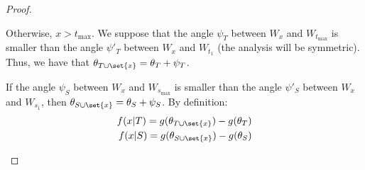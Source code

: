 \documentclass{article}
\theoremstyle{definition}
\theoremstyle{remark}
\begin{document}
\begin{proof}
\begin{enumerate}[label={(\arabic*)}]
      Otherwise, $x > t_{\max}$. We suppose that the angle $\psi_T$ between $W_x$ and $W_{t_{\max}}$ is smaller than the angle $\psi'_T$ between $W_x$ and $W_{t_1}$ (the analysis will be symmetric). Thus, we have that $\theta_{T \cup \set{x}} = \theta_T+\psi_T$.
      
      If the angle $\psi_S$ between $W_x$ and $W_{s_{\max}}$ is smaller than the angle $\psi'_S$ between $W_x$ and $W_{s_1}$, then $\theta_{S \cup \set{x}} = \theta_S+\psi_S$. By definition:
      \begin{equation}
        \begin{aligned}
          f(x|T) = g(\theta_{T \cup \set{x}})-g(\theta_T)\\
          f(x|S) = g(\theta_{S \cup \set{x}})-g(\theta_S)\\
        \end{aligned}
      \end{equation}


\end{enumerate}
\end{proof}
\end{document}
